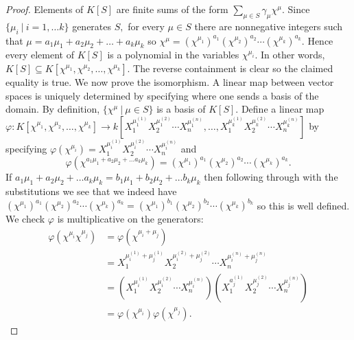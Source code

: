 \documentclass[BSc]{usydthesis}
\numberwithin{equation}{chapter}
\theoremstyle{remark}
\begin{document}
\begin{proof}
Elements of $K[S]$ are finite sums of the form $\displaystyle\sum_{\mu\in S} \gamma_{\mu} \chi^{\mu}.$ Since $\{ \mu_i \ | \ i=1,\ldots k \} $ generates $S,$ for every $\mu \in S$ there are nonnegative integers such that $\mu = a_1 \mu_1 + a_2 \mu_2 + \ldots + a_k \mu_k$ so $\chi^{\mu} = (\chi^{\mu_1})^{a_1} (\chi^{\mu_2})^{a_2} \cdots (\chi^{\mu_k})^{a_k}.$ Hence every element of $K[S]$ is a polynomial in the variables $\chi^{\mu_i}.$ In other words, $K[S] \subseteq K[\chi^{\mu_1} , \chi^{\mu_2} , \ldots , \chi^{\mu_k} ].$ The reverse containment is clear so the claimed equality is true. We now prove the isomorphism.
 A linear map between vector spaces is uniquely determined by specifying where one sends a basis of the domain. By definition, $\{ \chi^\mu \ | \ \mu \in S \}$ is a basis of $K[S].$ Define a linear map $\varphi: K[\chi^{\mu_1} , \chi^{\mu_2} , \ldots , \chi^{\mu_k} ] \to k\left[X_1^{ \mu_1^{(1)}} X_2^{ \mu_1^{(2)} } \cdots X_n^{ \mu_1^{(n)} } , \ldots , X_1^{ \mu_k^{(1)}} X_2^{ \mu_k^{(2)} } \cdots X_n^{ \mu_k^{(n)}}\right]$ by specifying $\varphi (\chi^{\mu_i}) = X_1^{\mu_i^{(1)}} X_2^{\mu_i^{(2)}} \cdots X_n^{\mu_i^{(n)}}$ and $$\varphi(\chi^{a_1\mu_1 + a_2 \mu_2 + \ldots a_k \mu_k}) = (\chi^{\mu_1})^{a_1} (\chi^{\mu_2})^{a_2} \cdots (\chi^{\mu_k})^{a_k}.$$ If $a_1\mu_1 + a_2 \mu_2 + \ldots a_k \mu_k = b_1\mu_1 + b_2 \mu_2 + \ldots b_k \mu_k$ then following through with the substitutions we see that we indeed have $(\chi^{\mu_1})^{a_1} (\chi^{\mu_2})^{a_2} \cdots (\chi^{\mu_k})^{a_k}=(\chi^{\mu_1})^{b_1} (\chi^{\mu_2})^{b_2} \cdots (\chi^{\mu_k})^{b_k}$ so this is well defined. We check $\varphi$ is multiplicative on the generators:
 \begin{align*}
  \varphi(\chi^{\mu_i} \chi^{\mu_j} ) &= \varphi(\chi^{\mu_i + \mu_j}) \\
   &=  X_1^{ \mu_i^{(1)}+\mu_j^{(1)} } X_2^{ \mu_i^{(2)}+\mu_j^{(2)} } \cdots X_n^{ \mu_i^{(n)} +\mu_j^{ (n)} } \\
   &= \left(X_1^{ \mu_i^{(1)}} X_2^{ \mu_i^{(2)} } \cdots X_n^{ \mu_i^{(n)}} \right)\left( X_1^{ a_j^{(1)}} X_2^{ \mu_j^{(2)} } \cdots X_n^{ \mu_j^{(n)}} \right)\\
   &= \varphi( \chi^{\mu_i} ) \varphi(\chi^{\mu_j}).
 \end{align*}
 

\end{proof}
\end{document}
